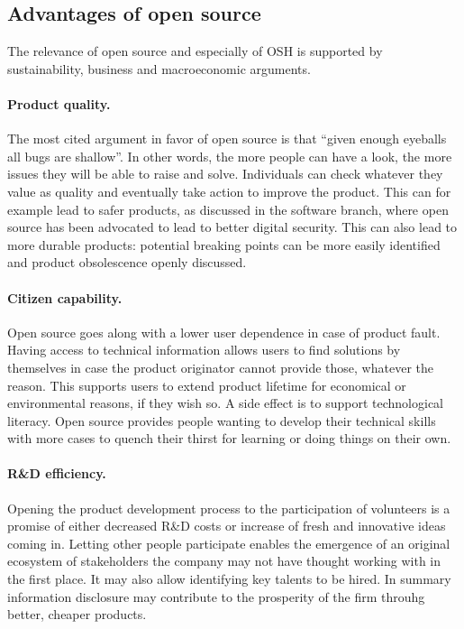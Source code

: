 \documentclass{article}
\begin{document}
\subsection{Advantages of open source}
\label{sec:advantages}
The relevance of open source and especially of OSH is supported by sustainability, business and macroeconomic arguments.

\paragraph{Product quality.} The most cited argument in favor of open source is that ``given enough eyeballs all bugs are shallow''. In other words, the more people can have a look, the more issues they will be able to raise and solve. Individuals can check whatever they value as quality and eventually take action to improve the product. This can for example lead to safer products, as discussed in the software branch, where open source has been advocated to lead to better digital security. This can also lead to more durable products: potential breaking points can be more easily identified and product obsolescence openly discussed.

\paragraph{Citizen capability.} Open source goes along with a lower user dependence in case of product fault. Having access to technical information allows users to find solutions by themselves in case the product originator cannot provide those, whatever the reason. This supports users to extend product lifetime for economical or environmental reasons, if they wish so. A side effect is to support technological literacy. Open source provides people wanting to develop their technical skills with more cases to quench their thirst for learning or doing things on their own.

\paragraph{R\&D efficiency.} Opening the product development process to the participation of volunteers is a promise of either decreased R\&D costs or increase of fresh and innovative ideas coming in. Letting other people participate enables the emergence of an original ecosystem of stakeholders the company may not have thought working with in the first place. It may also allow identifying key talents to be hired. In summary information disclosure may contribute to the prosperity of the firm throuhg better, cheaper products. 
\end{document}
